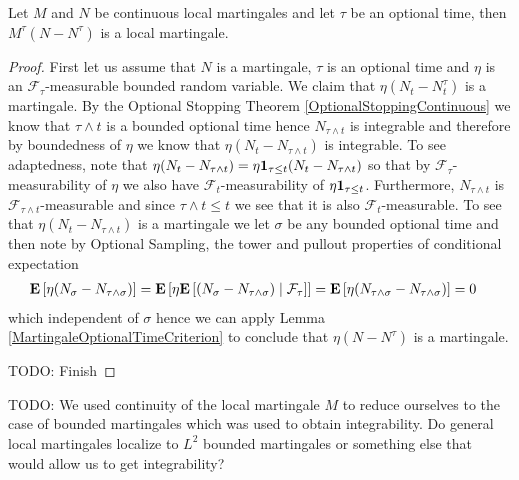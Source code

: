 \begin{lem}Let $M$ and $N$ be continuous local martingales and let $\tau$ be an optional time, then $M^\tau \left( N - N^\tau \right)$ is a local martingale.
\end{lem}
\begin{proof}
First let us assume that $N$ is a martingale, $\tau$ is an optional time and $\eta$ is an $\mathcal{F}_\tau$-measurable bounded random variable.  We claim that $\eta(N_t - N^\tau_t)$ is a martingale.  By the Optional Stopping Theorem \ref{OptionalStoppingContinuous} we know that $\tau \wedge t$ is a bounded optional time hence $N_{\tau \wedge t}$ is integrable and therefore by boundedness of $\eta$ we know that $\eta(N_t - N_{\tau \wedge t})$ is integrable.  To see adaptedness, note that $\eta(N_t - N_{\tau \wedge t}) = \eta \characteristic{\tau \leq t} (N_t - N_{\tau \wedge t})$ so that by $\mathcal{F}_\tau$-measurability of $\eta$ we also have $\mathcal{F}_t$-measurability of $\eta \characteristic{\tau \leq t}$.  Furthermore, $N_{\tau \wedge t}$ is $\mathcal{F}_{\tau \wedge t}$-measurable and since $\tau \wedge t \leq t$ we see that it is also $\mathcal{F}_t$-measurable.  To see that $\eta (N_t - N_{\tau \wedge t})$ is a martingale we let $\sigma$ be any bounded optional time and then note by Optional Sampling, the tower and pullout properties of conditional expectation 
\begin{align*}
\expectation{\eta (N_\sigma - N_{\tau \wedge \sigma})} &= \expectation{\eta \cexpectationlong{\mathcal{F}_\tau}{ (N_\sigma - N_{\tau \wedge \sigma})}} = \expectation{\eta  (N_{\tau \wedge \sigma} - N_{\tau \wedge \sigma})} = 0
\end{align*}
which independent of $\sigma$ hence we can apply Lemma \ref{MartingaleOptionalTimeCriterion} to conclude that $\eta(N - N^\tau)$ is a martingale.

TODO: Finish
\end{proof}

TODO: We used continuity of the local martingale $M$ to reduce ourselves to the case of bounded martingales which was used to obtain integrability.  Do general local martingales localize to $L^2$ bounded martingales or something else that would allow us to get integrability?


